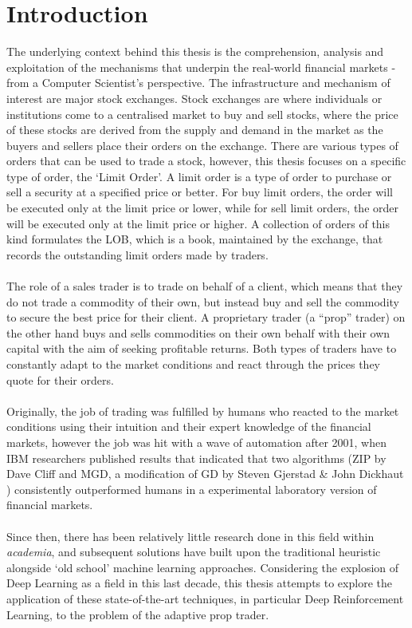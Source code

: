 \documentclass[ %
                    author={Ashwinder Khurana},
                supervisor={Prof Dave Cliff},
                    degree={MEng},
                     title={The Deeply Reinforced Trader},
                  subtitle={},
                      type={enterprise},
                      year={2020} ]{dissertation}
\begin{document}
\section{Introduction}
\label{section:Introduction}
The underlying context behind this thesis is the comprehension, analysis and exploitation of the mechanisms that underpin the real-world financial markets - from a Computer Scientist's perspective. The infrastructure and mechanism of interest are major stock exchanges. Stock exchanges are where individuals or institutions come to a centralised market to buy and sell stocks, where the price of these stocks are derived from the supply and demand in the market as the buyers and sellers place their orders on the exchange. There are various types of orders that can be used to trade a stock, however, this thesis focuses on a specific type of order, the \enquote*{Limit Order}. A limit order is a type of order to purchase or sell a security at a specified price or better. For buy limit orders, the order will be executed only at the limit price or lower, while for sell limit orders, the order will be executed only at the limit price or higher\cite{limit-order}. 
A collection of orders of this kind formulates the LOB, which is a book, maintained by the exchange, that records the outstanding limit orders made by traders.
\\
\\
The role of a sales trader is to trade on behalf of a client, which means that they do not trade a commodity of their own, but instead buy and sell the commodity to secure the best price for their client. A proprietary trader (a \enquote{prop} trader) on the other hand buys and sells commodities on their own behalf with their own capital with the aim of seeking profitable returns. Both types of traders have to constantly adapt to the market conditions and react through the prices they quote for their orders.
\\
\\
Originally, the job of trading was fulfilled by humans who reacted to the market conditions using their intuition and their expert knowledge of the financial markets, however the job was hit with a wave of automation after 2001, when IBM researchers published results that indicated that two algorithms (ZIP by Dave Cliff\cite{ZIP} and MGD, a modification of GD by Steven Gjerstad \& John Dickhaut \cite{MGD}) consistently outperformed humans in a experimental laboratory version of financial markets.
\\
\\
Since then, there has been relatively little research done in this field within \textit{academia}, and subsequent solutions have built upon the traditional heuristic alongside \enquote*{old school} machine learning approaches. Considering the explosion of Deep Learning as a field in this last decade, this thesis attempts to explore the application of these state-of-the-art techniques, in particular Deep Reinforcement Learning, to the problem of the adaptive prop trader.
\end{document}
